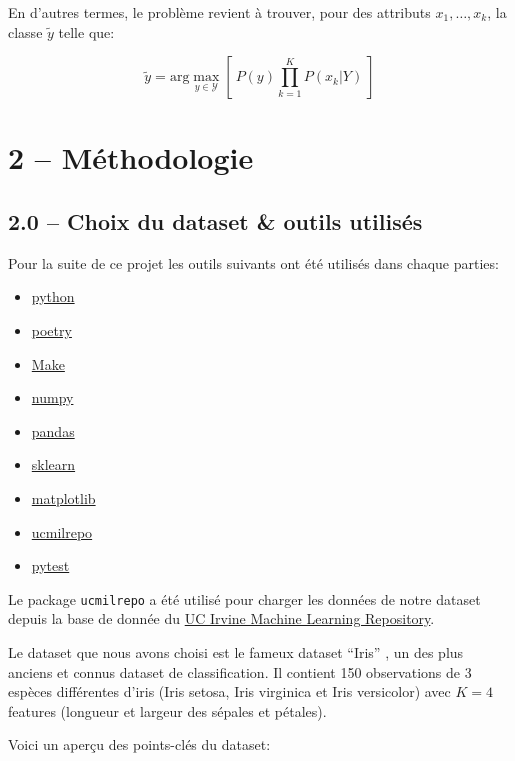 \documentclass[
]{article}
\providecommand{\tightlist}{%
  \setlength{\itemsep}{0pt}\setlength{\parskip}{0pt}}
\begin{document}
En d'autres termes, le problème revient à trouver, pour des attributs
\(x_1, \ldots, x_k\), la classe \(\tilde{y}\) telle que:

\[
\tilde{y} = \text{arg}\max_{y \in \mathcal{Y}} \left[\  P(y) \prod_{k = 1}^K{P(x_k | Y)}\  \right]
\]

\section{2 -- Méthodologie}\label{muxe9thodologie}

\subsection{2.0 -- Choix du dataset \& outils
utilisés}\label{choix-du-dataset-outils-utilisuxe9s}

Pour la suite de ce projet les outils suivants ont été utilisés dans
chaque parties:

\begin{itemize}
\tightlist
\item
  \href{https://www.python.org/}{python}
\item
  \href{https://python-poetry.org/}{poetry}
\item
  \href{https://www.gnu.org/software/make/}{Make}
\item
  \href{https://numpy.org/}{numpy}
\item
  \href{https://pandas.pydata.org/}{pandas}
\item
  \href{https://scikit-learn.org/stable/}{sklearn}
\item
  \href{https://matplotlib.org/}{matplotlib}
\item
  \href{https://github.com/uci-ml-repo/ucimlrepo}{ucmilrepo}
\item
  \href{https://docs.pytest.org/en/stable/}{pytest}
\end{itemize}

Le package \texttt{ucmilrepo} a été utilisé pour charger les données de
notre dataset depuis la base de donnée du
\href{https://archive.ics.uci.edu/ml/index}{UC Irvine Machine Learning
Repository}.

Le dataset que nous avons choisi est le fameux dataset ``Iris''
\cite{r.a.fisherIris1936}, un des plus anciens et connus dataset de
classification. Il contient 150 observations de 3 espèces différentes
d'iris (Iris setosa, Iris virginica et Iris versicolor) avec \(K = 4\)
features (longueur et largeur des sépales et pétales).

Voici un aperçu des points-clés du dataset:
\end{document}
